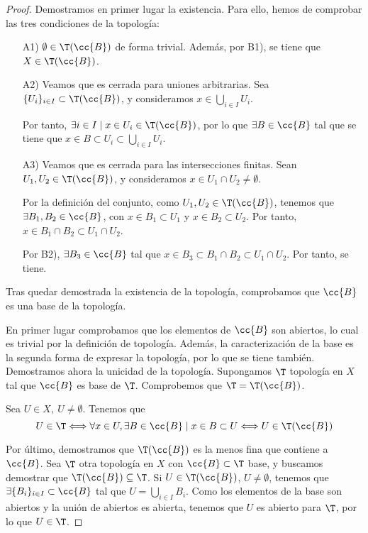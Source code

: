 \begin{proof}
    Demostramos en primer lugar la existencia. Para ello, hemos de comprobar las tres condiciones de la topología:
    \begin{enumerate}
        \item[A1)] $\emptyset\in \T(\cc{B})$ de forma trivial. Además, por B1), se tiene que $X\in \T(\cc{B})$.

        \item[A2)] Veamos que es cerrada para uniones arbitrarias. Sea $\{U_i\}_{i\in I}\subset \T(\cc{B})$, y consideramos $x\in \bigcup\limits_{i\in I}U_i$.
        
        Por tanto, $\exists i\in I\mid x\in U_i\in \T(\cc{B})$, por lo que $\exists B\in \cc{B}$ tal que se tiene que $x\in B\subset U_i\subset \bigcup\limits_{i\in I}U_i$.

        \item[A3)] Veamos que es cerrada para las intersecciones finitas. Sean $U_1,U_2\in \T(\cc{B})$, y consideramos $x\in U_1\cap U_2\neq \emptyset$.

        Por la definición del conjunto, como $U_1,U_2\in \T(\cc{B})$, tenemos que $\exists B_1,B_2\in \cc{B}$, con $x\in B_1\subset U_1$ y $x\in B_2\subset U_2$. Por tanto, $x\in B_1\cap B_2\subset U_1\cap U_2$.

        Por B2), $\exists B_3\in \cc{B}$ tal que $x\in B_3\subset B_1\cap B_2\subset U_1\cap U_2$. Por tanto, se tiene.
    \end{enumerate}

    Tras quedar demostrada la existencia de la topología, comprobamos que $\cc{B}$ es una base de la topología.
    
    En primer lugar comprobamos que los elementos de $\cc{B}$ son abiertos, lo cual es trivial por la definición de topología. Además, la caracterización de la base es la segunda forma de expresar la topología, por lo que se tiene también.\\

    Demostramos ahora la unicidad de la topología. Supongamos $\T$ topología en $X$ tal que $\cc{B}$ es base de $\T$. Comprobemos que $\T=\T(\cc{B})$.

    Sea $U\in X,~U\neq \emptyset$. Tenemos que
    \begin{equation*}
        U\in \T\Longleftrightarrow \forall x\in U, \exists B\in \cc{B}\mid x\in B\subset U
        \Longleftrightarrow U\in \T(\cc{B})
    \end{equation*}

    Por último, demostramos que $\T(\cc{B})$ es la menos fina que contiene a $\cc{B}$. Sea $\T$ otra topología en $X$ con $\cc{B}\subset \T$ base, y buscamos demostrar que $\T(\cc{B})\subseteq \T$. Si $U\in \T(\cc{B})$, $U\neq \emptyset$, tenemos que $\exists \{B_i\}_{i\in I}\subset \cc{B}$ tal que $U=\bigcup\limits_{i\in I} B_i$. Como los elementos de la base son abiertos y la unión de abiertos es abierta, tenemos que $U$ es abierto para $\T$, por lo que $U\in \T$.
\end{proof}


